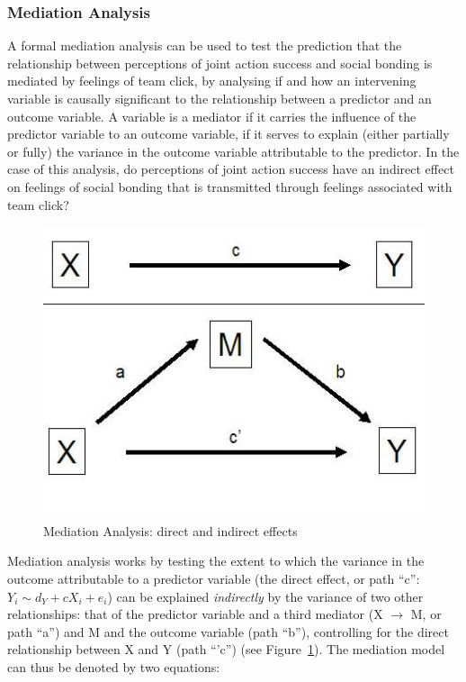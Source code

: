 \begin{CJK}{UTF8}{gbsn}




\subsubsection{Mediation Analysis\label{app8:mediationAnalysis}}
A formal mediation analysis can be used to test the prediction that the relationship between perceptions of joint action success and social bonding is mediated by feelings of team click, by analysing if and how an intervening variable is causally significant to the relationship between a predictor and an outcome variable. A variable is a mediator if it carries the influence of the predictor variable to an outcome variable, if it serves to explain (either partially or fully) the variance in the outcome variable attributable to the predictor. In the case of this analysis, do perceptions of joint action success have an indirect effect on feelings of social bonding that is transmitted through feelings associated with team click?

\begin{figure}[htbp]
  \begin{center}
    \includegraphics[scale = .5]{images/mediation_image.jpg}
    \caption{Mediation Analysis: direct and indirect effects}
    \label{fig:mediationAnalysis}
  \end{center}
\end{figure}

Mediation analysis works by testing the extent to which the variance in the outcome attributable to a predictor variable (the direct effect, or path ``c'': $Y_i \sim d_Y + cX_i + e_i$) can be explained \textit{indirectly} by the variance of two other relationships: that of the predictor variable and a third mediator (X $\rightarrow$ M, or path ``a'')  and M and the outcome variable (path ``b''), controlling for the direct relationship between X and Y (path ``'c'') (see Figure~\ref{fig:mediationAnalysis}). The mediation model can thus be denoted by two equations:


\end{CJK}
